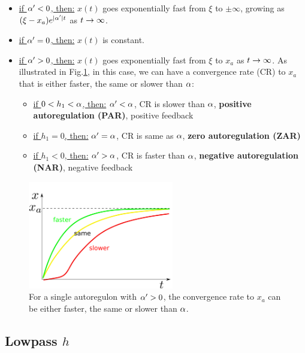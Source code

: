 \begin{itemize}
\item
\ul{if $\alpha'<0$, then:} $x(t)$ 
goes exponentially fast  from $\xi $ to $\pm \infty$,
growing as  $(\xi  -x_a)e^{|\alpha'|t}$
as $t\rightarrow \infty$. 

\item \ul{if $\alpha'=0$, then:}
$x(t)$ is constant. 

\item 
\ul{if $\alpha'>0$, then:} $x(t)$ goes exponentially fast from
$\xi $ to $x_a$ as $t\rightarrow \infty$.
As illustrated in Fig.\ref{fig-fast-normal-slow}, in
this case,
we can have a convergence rate (CR)
 to $x_a$
 that is either faster, the same or slower than $\alpha$:
\begin{itemize}[$\checkmark$]

\item \ul{if $0<h_1<\alpha$, then:} $\alpha'<\alpha$, 
CR is slower than $\alpha$, {\bf positive autoregulation (PAR)}, positive feedback

\item \ul{if $h_1=0$, then:} $\alpha'=\alpha$, CR is same as $\alpha$,
{\bf zero autoregulation (ZAR)}

\item \ul{if $h_1<0$, then:} $\alpha'>\alpha$, CR is faster than $\alpha$,
{\bf negative autoregulation (NAR)},
negative feedback
\end{itemize}
\end{itemize}


\begin{figure}[h!]
\centering
\includegraphics[width=2.5in]
{autoregulons/fast-normal-slow.png}
\caption{For a single autoregulon
with $\alpha'>0$, the convergence rate to $x_a$ can 
be either faster, the same or slower than $\alpha$.
 }
\label{fig-fast-normal-slow}
\end{figure}




\subsection{Lowpass $h$}
\label{sec-lowpass-h}

